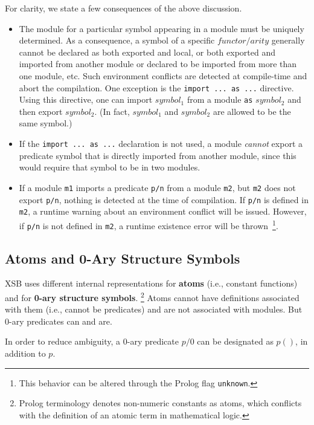 For clarity, we state a few consequences of the above discussion.
\begin{itemize}
\item The module for a particular symbol appearing in a module must be
  uniquely determined.  As a consequence, a symbol of a specific
  $functor/arity$ generally cannot be declared as both exported and
  local, or both exported and imported from another module or declared
  to be imported from more than one module, etc.  Such environment
  conflicts are detected at compile-time and abort the compilation.
  One exception is the {\tt import ... as ...} directive.  Using this
  directive, one can import $symbol_1$ from a module {\tt as}
  $symbol_2$ and then export $symbol_2$.  (In fact, $symbol_1$ and
  $symbol_2$ are allowed to be the same symbol.)
%
\item If the {\tt import ... as ...} declaration is not used, a module
  {\em cannot} export a predicate symbol that is directly imported
  from another module, since this would require that symbol to be in
  two modules.
%
\item If a module {\tt m1} imports a predicate {\tt p/n} from a module
  {\tt m2}, but {\tt m2} does not export {\tt p/n}, nothing is
  detected at the time of compilation.  If {\tt p/n} is defined in
  {\tt m2}, a runtime warning about an environment conflict will be
  issued.  However, if {\tt p/n} is not defined in {\tt m2}, a runtime
  existence error will be thrown~\footnote{This behavior can be
    altered through the Prolog flag {\tt unknown}.}.
\end{itemize}

\subsection{Atoms and 0-Ary Structure Symbols}

XSB uses different internal representations for {\bf atoms} (i.e.,
constant functions) and for {\bf 0-ary structure
  symbols}. \footnote{Prolog terminology denotes non-numeric constants
  as atoms, which conflicts with the definition of an atomic term in
  mathematical logic.}  Atoms cannot have definitions associated with
them (i.e., cannot be predicates) and are not associated with modules.
But 0-ary predicates can and are.

In order to reduce ambiguity, a 0-ary predicate $p/0$ can be
designated as $p()$, in addition to $p$.


